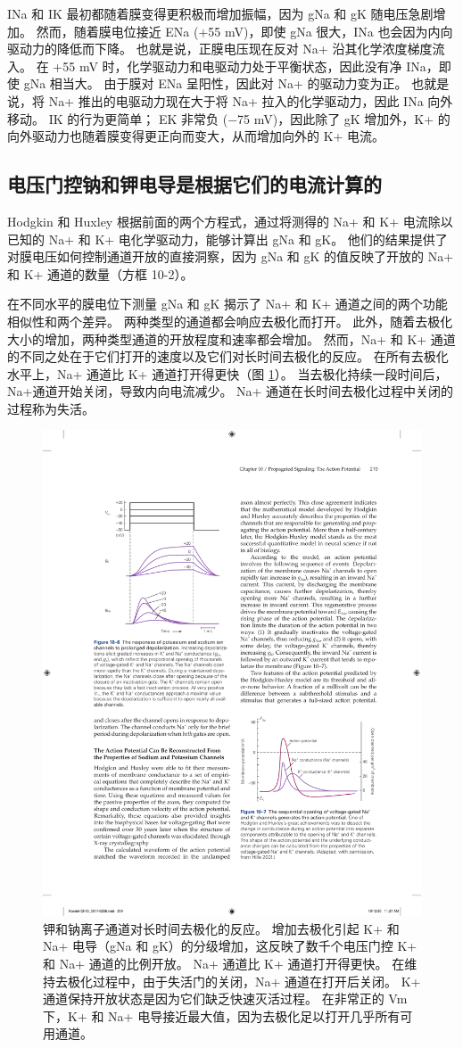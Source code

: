 INa 和 IK 最初都随着膜变得更积极而增加振幅，因为 gNa 和 gK 随电压急剧增加。 
然而，随着膜电位接近 ENa (+55 mV)，即使 gNa 很大，INa 也会因为内向驱动力的降低而下降。 也就是说，正膜电压现在反对 Na+ 沿其化学浓度梯度流入。 
在 +55 mV 时，化学驱动力和电驱动力处于平衡状态，因此没有净 INa，即使 gNa 相当大。 
由于膜对 ENa 呈阳性，因此对 Na+ 的驱动力变为正。 
也就是说，将 Na+ 推出的电驱动力现在大于将 Na+ 拉入的化学驱动力，因此 INa 向外移动。 
IK 的行为更简单； EK 非常负 (−75 mV)，因此除了 gK 增加外，K+ 的向外驱动力也随着膜变得更正向而变大，从而增加向外的 K+ 电流。



\subsection{电压门控钠和钾电导是根据它们的电流计算的}
Hodgkin 和 Huxley 根据前面的两个方程式，通过将测得的 Na+ 和 K+ 电流除以已知的 Na+ 和 K+ 电化学驱动力，能够计算出 gNa 和 gK。 
他们的结果提供了对膜电压如何控制通道开放的直接洞察，因为 gNa 和 gK 的值反映了开放的 Na+ 和 K+ 通道的数量（方框 10-2）。


在不同水平的膜电位下测量 gNa 和 gK 揭示了 Na+ 和 K+ 通道之间的两个功能相似性和两个差异。 
两种类型的通道都会响应去极化而打开。 
此外，随着去极化大小的增加，两种类型通道的开放程度和速率都会增加。 
然而，Na+ 和 K+ 通道的不同之处在于它们打开的速度以及它们对长时间去极化的反应。 
在所有去极化水平上，Na+ 通道比 K+ 通道打开得更快（图 \ref{fig:10_6}）。 
当去极化持续一段时间后，Na+通道开始关闭，导致内向电流减少。 
Na+ 通道在长时间去极化过程中关闭的过程称为失活。

\begin{figure}[htbp]
	\centering
	\includegraphics[width=0.5\linewidth]{chap10/fig_10_6}
	\caption{钾和钠离子通道对长时间去极化的反应。 增加去极化引起 K+ 和 Na+ 电导（gNa 和 gK）的分级增加，这反映了数千个电压门控 K+ 和 Na+ 通道的比例开放。 Na+ 通道比 K+ 通道打开得更快。 在维持去极化过程中，由于失活门的关闭，Na+ 通道在打开后关闭。 K+ 通道保持开放状态是因为它们缺乏快速灭活过程。 在非常正的 Vm 下，K+ 和 Na+ 电导接近最大值，因为去极化足以打开几乎所有可用通道。}
	\label{fig:10_6}
\end{figure}


